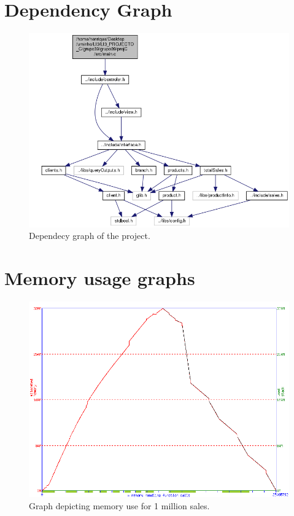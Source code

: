 \documentclass[a4paper]{report}
\begin{document}
\appendix
\chapter{Dependency Graph}
\begin{figure}[H]
    \begin{center}
        \includegraphics[width=1\textwidth]{dependency.png}\par
        \caption{Dependecy graph of the project.}
        \label{img:dependency graph}
    \end{center}
\end{figure}

\chapter{Memory usage graphs}
\begin{figure}[H]
    \begin{center}
        \includegraphics[width=1\textwidth]{memusage.png}\par\vspace{1cm}
        \caption{Graph depicting memory use for 1 million sales.}
        \label{img:memusage}
    \end{center}
\end{figure}
\end{document}
